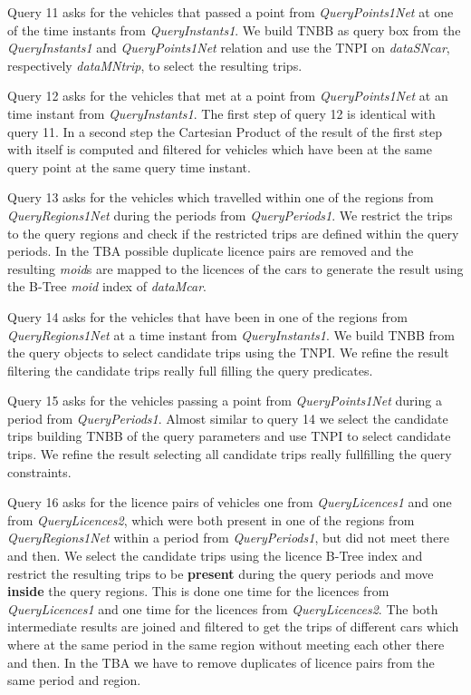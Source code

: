 \documentclass[a4paper]{article}
\newcommand{\op}[1]{\textbf{#1}}
\begin{document}
Query 11 asks for the vehicles that passed a point from \textit{QueryPoints1Net}
at one of the time instants from \textit{QueryInstants1}. We build TNBB as query
box from the \textit{QueryInstants1} and \textit{QueryPoints1Net} relation and
use the TNPI on \textit{dataSNcar}, respectively \textit{dataMNtrip}, to select
the resulting trips.

Query 12 asks for the vehicles that met at a point from \textit{QueryPoints1Net}
at an time instant from \textit{QueryInstants1}. The first step of query 12 is
identical with query 11.
In a second step the Cartesian Product of the result of the first step with
itself is computed and filtered for vehicles which have been at the same query point
at the same query time instant.

Query 13 asks for the vehicles which travelled within one of the regions from
\textit{QueryRegions1Net} during the periods from \textit{QueryPeriods1}. We
restrict the trips to the query regions and check if the restricted trips are
defined within the query periods. In the TBA possible duplicate licence pairs
are removed and the resulting \textit{moid}s are mapped to the licences of the
cars to generate the result using the B-Tree \textit{moid} index of \textit{dataMcar}.

Query 14 asks for the vehicles that have been in one of the regions from
\textit{QueryRegions1Net} at a time instant from \textit{QueryInstants1}. We build
TNBB from the query objects to select candidate trips using the TNPI. We refine
the result filtering the candidate trips really full filling the query predicates.

Query 15 asks for the vehicles passing a point from \textit{QueryPoints1Net} during a
period from \textit{QueryPeriods1}. Almost similar to query 14 we select the candidate
trips building TNBB of the query parameters and use TNPI to select candidate trips.
We refine the result selecting all candidate trips really fullfilling
the query constraints.

Query 16 asks for the licence pairs of vehicles one from \textit{QueryLicences1}
and one from \textit{QueryLicences2}, which were both present in one of the regions
from \textit{QueryRegions1Net} within a period from \textit{QueryPeriods1}, but
did not meet there and then. We select the candidate trips using the licence
B-Tree index and restrict the resulting trips to be \op{present} during the query
periods and move \op{inside} the query regions. This is done one time for the licences
from \textit{QueryLicences1} and one time for the licences from \textit{QueryLicences2}.
The both intermediate results are joined and filtered to get the
trips of different cars which where at the same period in the same region
without meeting each other there and then. In the TBA we have
to remove duplicates of licence pairs from the same period and region.
\end{document}
